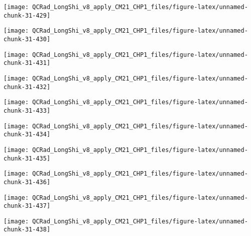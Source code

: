 \documentclass[
  10pt,
  a4paper,oneside]{article}
\begin{document}
\begin{center}\texttt{[image: QCRad\_LongShi\_v8\_apply\_CM21\_CHP1\_files/figure-latex/unnamed-chunk-31-429]} \end{center}

\begin{center}\texttt{[image: QCRad\_LongShi\_v8\_apply\_CM21\_CHP1\_files/figure-latex/unnamed-chunk-31-430]} \end{center}

\begin{center}\texttt{[image: QCRad\_LongShi\_v8\_apply\_CM21\_CHP1\_files/figure-latex/unnamed-chunk-31-431]} \end{center}

\begin{center}\texttt{[image: QCRad\_LongShi\_v8\_apply\_CM21\_CHP1\_files/figure-latex/unnamed-chunk-31-432]} \end{center}

\begin{center}\texttt{[image: QCRad\_LongShi\_v8\_apply\_CM21\_CHP1\_files/figure-latex/unnamed-chunk-31-433]} \end{center}

\begin{center}\texttt{[image: QCRad\_LongShi\_v8\_apply\_CM21\_CHP1\_files/figure-latex/unnamed-chunk-31-434]} \end{center}

\begin{center}\texttt{[image: QCRad\_LongShi\_v8\_apply\_CM21\_CHP1\_files/figure-latex/unnamed-chunk-31-435]} \end{center}

\begin{center}\texttt{[image: QCRad\_LongShi\_v8\_apply\_CM21\_CHP1\_files/figure-latex/unnamed-chunk-31-436]} \end{center}

\begin{center}\texttt{[image: QCRad\_LongShi\_v8\_apply\_CM21\_CHP1\_files/figure-latex/unnamed-chunk-31-437]} \end{center}

\begin{center}\texttt{[image: QCRad\_LongShi\_v8\_apply\_CM21\_CHP1\_files/figure-latex/unnamed-chunk-31-438]} \end{center}
\end{document}
